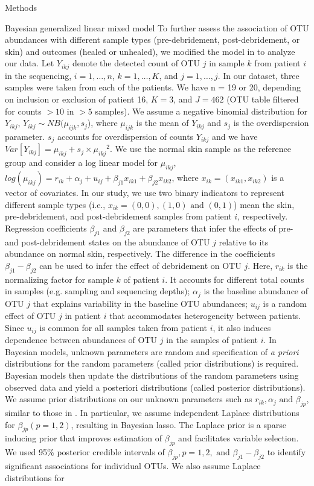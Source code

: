 \documentclass[oneside,12pt,final]{sty/ucthesis-CA2012}
\begin{document}
\begin{mainmatter}
\begin{section}{Methods}
\begin{subsection}{Bayesian generalized linear mixed model}
To further assess the association of OTU abundances with different sample types (pre-debridement, post-debridement, or skin) and outcomes (healed or unhealed), we modified the model in \cite{RN33} to analyze our data. Let $Y_{ikj}$ denote the detected count of OTU $j$ in sample $k$ from patient $i$ in the sequencing, $i = 1,\ldots,n$, $k = 1,\ldots,K$, and $j = 1,\ldots,j$. In our dataset, three samples were taken from each of the patients. We have n = 19 or 20, depending on inclusion or exclusion of patient 16, $K = 3$, and $J = 462$ (OTU table filtered for counts $> 10$ in $> 5$ samples). We assume a negative binomial distribution for $Y_{ikj}$, $Y_{ikj} \sim NB(\mu_{ijk},s_{j}$), where $\mu_{ijk}$ is the mean of $Y_{ikj}$ and $s_{j}$ is the overdispersion parameter. $s_{j}$ accounts for overdispersion of counts $Y_{ikj}$ and we have $Var[Y_{ikj}] = \mu_{ikj} + s_{j} \times {\mu_{ikj}}^{2}$. We use the normal skin sample as the reference group and consider a log linear model for $\mu_{ikj}$, $log(\mu_{ikj}) = r_{ik} + \alpha_{j} + u_{ij} + \beta_{j1}x_{ik1} + \beta_{j2}x_{ik2}$, where $x_{ik} = (x_{ik1}, x_{ik2})$ is a vector of covariates. In our study, we use two binary indicators to represent different sample types (i.e., $x_{ik} = (0, 0), (1, 0) \text{ and } (0, 1)$) mean the skin, pre-debridement, and post-debridement samples from patient $i$, respectively. Regression coefficients $\beta_{j1}$ and $\beta_{j2}$ are parameters that infer the effects of pre- and post-debridement states on the abundance of OTU $j$ relative to its abundance on normal skin, respectively. The difference in the coefficients $\beta_{j1} - \beta_{j2}$ can be used to infer the effect of debridement on OTU $j$. Here, $r_{ik}$ is the normalizing factor for sample $k$ of patient $i$. It accounts for different total counts in samples (e.g. sampling and sequencing depths); $\alpha_{j}$ is the baseline abundance of OTU $j$ that explains variability in the baseline OTU abundances; $u_{ij}$ is a random effect of OTU $j$ in patient $i$ that accommodates heterogeneity between patients. Since $u_{ij}$ is common for all samples taken from patient $i$, it also induces dependence between abundances of OTU $j$ in the samples of patient $i$. In Bayesian models, unknown parameters are random and specification of \textit{a priori} distributions for the random parameters (called prior distributions) is required. Bayesian models then update the distributions of the random parameters using observed data and yield a posteriori distributions (called posterior distributions). We assume prior distributions on our unknown parameters such as $r_{ik}, \alpha_{j} \text{ and } \beta_{jp}$, similar to those in \cite{RN33}. In particular, we assume independent Laplace distributions for $\beta_{jp} (p = 1, 2)$, resulting in Bayesian lasso. The Laplace prior is a sparse inducing prior that improves estimation of $\beta_{jp}$ and facilitates variable selection. We used 95\% posterior credible intervals of  $\beta_{jp}, p = 1, 2, \text{ and } \beta_{j1} - \beta_{j2}$ to identify significant associations for individual OTUs. We also assume Laplace distributions for 
\end{subsection}
\end{section}
\end{mainmatter}
\end{document}
